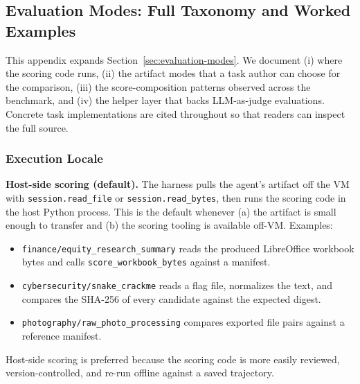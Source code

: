 \subsection{Evaluation Modes: Full Taxonomy and Worked Examples}
\label{app:evaluation-modes}

This appendix expands Section~\ref{sec:evaluation-modes}. We document (i) where the scoring code runs, (ii) the artifact modes that a task author can choose for the comparison, (iii) the score-composition patterns observed across the benchmark, and (iv) the helper layer that backs LLM-as-judge evaluations. Concrete task implementations are cited throughout so that readers can inspect the full source.

\subsubsection{Execution Locale}
\label{app:eval-locale}

\noindent \textbf{Host-side scoring (default).}
The harness pulls the agent's artifact off the VM with \texttt{session.read\_file} or \texttt{session.read\_bytes}, then runs the scoring code in the host Python process. This is the default whenever (a) the artifact is small enough to transfer and (b) the scoring tooling is available off-VM. Examples:
\begin{itemize}[nosep,leftmargin=1.2em]
    \item \texttt{finance/equity\_research\_summary} reads the produced LibreOffice workbook bytes and calls \texttt{score\_workbook\_bytes} against a manifest.
    \item \texttt{cybersecurity/snake\_crackme} reads a flag file, normalizes the text, and compares the SHA-256 of every candidate against the expected digest.
    \item \texttt{photography/raw\_photo\_processing} compares exported file pairs against a reference manifest.
\end{itemize}
Host-side scoring is preferred because the scoring code is more easily reviewed, version-controlled, and re-run offline against a saved trajectory.

